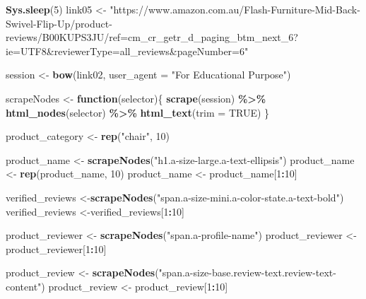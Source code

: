 \documentclass[
]{article}
\newenvironment{Shaded}{\begin{snugshade}}{\end{snugshade}}
\newcommand{\AttributeTok}[1]{\textcolor[rgb]{0.13,0.29,0.53}{#1}}
\newcommand{\ConstantTok}[1]{\textcolor[rgb]{0.56,0.35,0.01}{#1}}
\newcommand{\ControlFlowTok}[1]{\textcolor[rgb]{0.13,0.29,0.53}{\textbf{#1}}}
\newcommand{\DecValTok}[1]{\textcolor[rgb]{0.00,0.00,0.81}{#1}}
\newcommand{\FunctionTok}[1]{\textcolor[rgb]{0.13,0.29,0.53}{\textbf{#1}}}
\newcommand{\NormalTok}[1]{#1}
\newcommand{\OtherTok}[1]{\textcolor[rgb]{0.56,0.35,0.01}{#1}}
\newcommand{\SpecialCharTok}[1]{\textcolor[rgb]{0.81,0.36,0.00}{\textbf{#1}}}
\newcommand{\StringTok}[1]{\textcolor[rgb]{0.31,0.60,0.02}{#1}}
\begin{document}
\begin{Shaded}
\begin{Highlighting}[]
   \FunctionTok{Sys.sleep}\NormalTok{(}\DecValTok{5}\NormalTok{)}
\NormalTok{link05 }\OtherTok{\textless{}{-}} \StringTok{"https://www.amazon.com.au/Flash{-}Furniture{-}Mid{-}Back{-}Swivel{-}Flip{-}Up/product{-}reviews/B00KUPS3JU/ref=cm\_cr\_getr\_d\_paging\_btm\_next\_6?ie=UTF8\&reviewerType=all\_reviews\&pageNumber=6"}


\NormalTok{  session }\OtherTok{\textless{}{-}} \FunctionTok{bow}\NormalTok{(link02,}
               \AttributeTok{user\_agent =} \StringTok{"For Educational Purpose"}\NormalTok{)}

\NormalTok{  scrapeNodes }\OtherTok{\textless{}{-}} \ControlFlowTok{function}\NormalTok{(selector)\{}
    \FunctionTok{scrape}\NormalTok{(session) }\SpecialCharTok{\%\textgreater{}\%}
      \FunctionTok{html\_nodes}\NormalTok{(selector) }\SpecialCharTok{\%\textgreater{}\%}
      \FunctionTok{html\_text}\NormalTok{(}\AttributeTok{trim =} \ConstantTok{TRUE}\NormalTok{)}
\NormalTok{  \}}

\NormalTok{  product\_category }\OtherTok{\textless{}{-}} \FunctionTok{rep}\NormalTok{(}\StringTok{"chair"}\NormalTok{, }\DecValTok{10}\NormalTok{)}

\NormalTok{  product\_name }\OtherTok{\textless{}{-}} \FunctionTok{scrapeNodes}\NormalTok{(}\StringTok{"h1.a{-}size{-}large.a{-}text{-}ellipsis"}\NormalTok{)}
\NormalTok{  product\_name }\OtherTok{\textless{}{-}} \FunctionTok{rep}\NormalTok{(product\_name, }\DecValTok{10}\NormalTok{)}
\NormalTok{  product\_name }\OtherTok{\textless{}{-}}\NormalTok{ product\_name[}\DecValTok{1}\SpecialCharTok{:}\DecValTok{10}\NormalTok{]}
  
\NormalTok{  verified\_reviews }\OtherTok{\textless{}{-}}\FunctionTok{scrapeNodes}\NormalTok{(}\StringTok{"span.a{-}size{-}mini.a{-}color{-}state.a{-}text{-}bold"}\NormalTok{)}
\NormalTok{  verified\_reviews }\OtherTok{\textless{}{-}}\NormalTok{verified\_reviews[}\DecValTok{1}\SpecialCharTok{:}\DecValTok{10}\NormalTok{]}
  
\NormalTok{  product\_reviewer }\OtherTok{\textless{}{-}} \FunctionTok{scrapeNodes}\NormalTok{(}\StringTok{"span.a{-}profile{-}name"}\NormalTok{)}
\NormalTok{  product\_reviewer }\OtherTok{\textless{}{-}}\NormalTok{ product\_reviewer[}\DecValTok{1}\SpecialCharTok{:}\DecValTok{10}\NormalTok{]}
  
\NormalTok{  product\_review }\OtherTok{\textless{}{-}} \FunctionTok{scrapeNodes}\NormalTok{(}\StringTok{"span.a{-}size{-}base.review{-}text.review{-}text{-}content"}\NormalTok{)}
\NormalTok{  product\_review }\OtherTok{\textless{}{-}}\NormalTok{ product\_review[}\DecValTok{1}\SpecialCharTok{:}\DecValTok{10}\NormalTok{]}
  

\end{Highlighting}
\end{Shaded}
\end{document}
